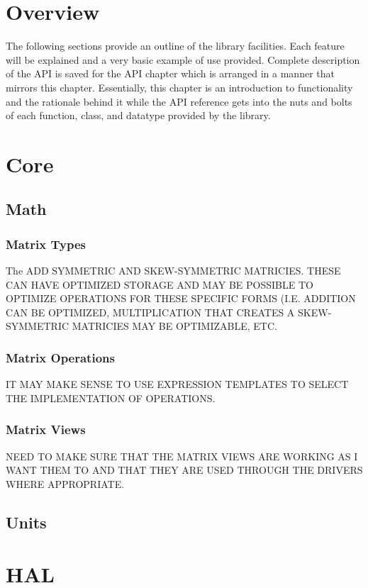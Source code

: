 \documentclass[10pt,letterpaper]{memoir} %
\begin{document}
\section{Overview}
The following sections provide an outline of the library facilities.  Each feature will be explained and a very basic example of use provided.  Complete description of the API is saved for the API chapter which is arranged in a manner that mirrors this chapter.  Essentially, this chapter is an introduction to functionality and the rationale behind it while the API reference gets into the nuts and bolts of each function, class, and datatype provided by the library.

\section{Core}
\subsection{Math}
\subsubsection{Matrix Types}
The 
ADD SYMMETRIC AND SKEW-SYMMETRIC MATRICIES.  THESE CAN HAVE OPTIMIZED STORAGE AND MAY BE POSSIBLE TO OPTIMIZE OPERATIONS FOR THESE SPECIFIC FORMS (I.E. ADDITION CAN BE OPTIMIZED, MULTIPLICATION THAT CREATES A SKEW-SYMMETRIC MATRICIES MAY BE OPTIMIZABLE, ETC.

\subsubsection{Matrix Operations}
IT MAY MAKE SENSE TO USE EXPRESSION TEMPLATES TO SELECT THE IMPLEMENTATION OF OPERATIONS.

\subsubsection{Matrix Views}
NEED TO MAKE SURE THAT THE MATRIX VIEWS ARE WORKING AS I WANT THEM TO AND THAT THEY ARE USED THROUGH THE DRIVERS WHERE APPROPRIATE.

\subsection{Units}

\section{HAL}
\end{document}

